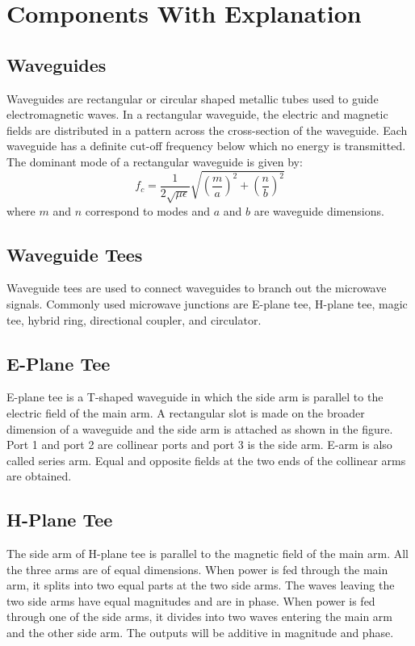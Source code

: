 \documentclass[11pt, a4paper]{article}
\begin{document}
\section*{Components With Explanation}
\subsection{Waveguides}
Waveguides are rectangular or circular shaped metallic tubes used to guide electromagnetic waves. In a
rectangular waveguide, the electric and magnetic fields are distributed in a pattern across the cross-section of the
waveguide. Each waveguide has a definite cut-off frequency below which no energy is transmitted.
The dominant mode of a rectangular waveguide is given by:
$$f_c = \frac{1}{2\sqrt{\mu\epsilon}}
\sqrt{\left(\frac{m}{a}\right)^2 + \left(\frac{n}{b}\right)^2}$$
where $m$ and $n$ correspond to modes and $a$ and $b$ are waveguide dimensions.
\subsection{Waveguide Tees}
Waveguide tees are used to connect waveguides to branch out the microwave signals. Commonly used microwave
junctions are E-plane tee, H-plane tee, magic tee, hybrid ring, directional coupler, and circulator.
\subsection{E-Plane Tee}
E-plane tee is a T-shaped waveguide in which the side arm is parallel to the electric field of the main arm. A
rectangular slot is made on the broader dimension of a waveguide and the side arm is attached as shown in the
figure. Port 1 and port 2 are collinear ports and port 3 is the side arm. E-arm is also called series arm. Equal and
opposite fields at the two ends of the collinear arms are obtained.
\subsection{H-Plane Tee}
The side arm of H-plane tee is parallel to the magnetic field of the main arm. All the three arms are of equal
dimensions. When power is fed through the main arm, it splits into two equal parts at the two side arms. The
waves leaving the two side arms have equal magnitudes and are in phase.
When power is fed through one of the side arms, it divides into two waves entering the main arm and the other
side arm. The outputs will be additive in magnitude and phase.
\end{document}
